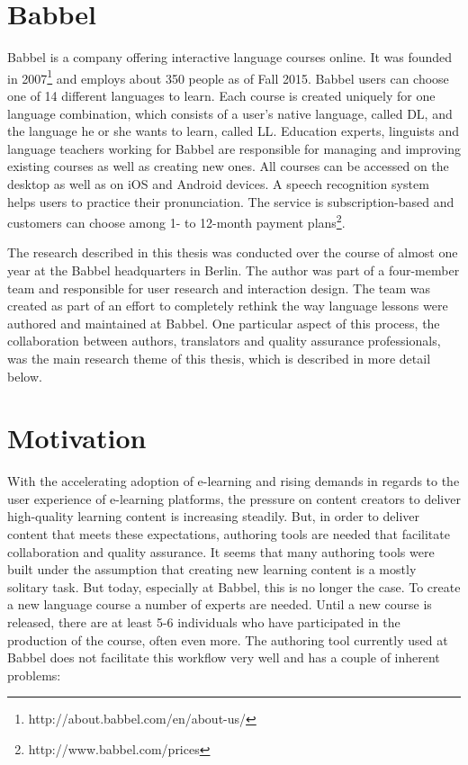 \section{Babbel}
Babbel is a company offering interactive language courses online. It was founded in 2007\footnote{http://about.babbel.com/en/about-us/} and employs about 350 people as of Fall 2015. Babbel users can choose one of 14 different languages to learn. Each course is created uniquely for one language combination, which consists of a user's native language, called \ac{DL}, and the language he or she wants to learn, called \ac{LL}. Education experts, linguists and language teachers working for Babbel are responsible for managing and improving existing courses as well as creating new ones. All courses can be accessed on the desktop as well as on iOS and Android devices. A speech recognition system helps users to practice their pronunciation. The service is subscription-based and customers can choose among 1- to 12-month payment plans\footnote{http://www.babbel.com/prices}.

The research described in this thesis was conducted over the course of almost one year at the Babbel headquarters in Berlin. The author was part of a four-member team and responsible for user research and interaction design. The team was created as part of an effort to completely rethink the way language lessons were authored and maintained at Babbel. One particular aspect of this process, the collaboration between authors, translators and quality assurance professionals, was the main research theme of this thesis, which is described in more detail below.

\section{Motivation} %
With the accelerating adoption of e-learning and rising demands in regards to the user experience of e-learning platforms, the pressure on content creators to deliver high-quality learning content is increasing steadily. But, in order to deliver content that meets these expectations, authoring tools are needed that facilitate collaboration and quality assurance. It seems that many authoring tools were built under the assumption that creating new learning content is a mostly solitary task. But today, especially at Babbel, this is no longer the case. To create a new language course a number of experts are needed. Until a new course is released, there are at least 5-6 individuals who have participated in the production of the course, often even more. The authoring tool currently used at Babbel does not facilitate this workflow very well and has a couple of inherent problems:

